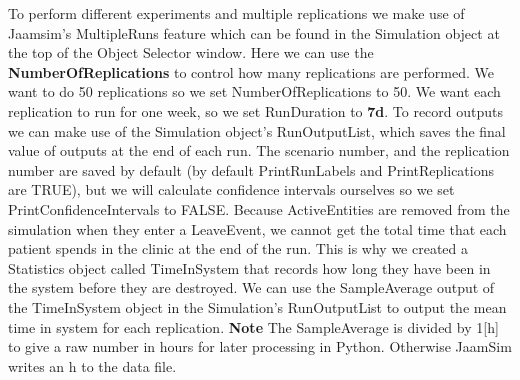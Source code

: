\documentclass[
  10pt,
  a4paperpaper,
  DIV=11,
  numbers=noendperiod,
  oneside]{scrreprt}
\begin{document}
To perform different experiments and multiple replications we make use
of Jaamsim's MultipleRuns feature which can be found in the Simulation
object at the top of the Object Selector window. Here we can use the
\textbf{NumberOfReplications} to control how many replications are
performed. We want to do 50 replications so we set NumberOfReplications
to 50. We want each replication to run for one week, so we set
RunDuration to \textbf{7d}. To record outputs we can make use of the
Simulation object's RunOutputList, which saves the final value of
outputs at the end of each run. The scenario number, and the replication
number are saved by default (by default PrintRunLabels and
PrintReplications are TRUE), but we will calculate confidence intervals
ourselves so we set PrintConfidenceIntervals to FALSE. Because
ActiveEntities are removed from the simulation when they enter a
LeaveEvent, we cannot get the total time that each patient spends in the
clinic at the end of the run. This is why we created a Statistics object
called TimeInSystem that records how long they have been in the system
before they are destroyed. We can use the SampleAverage output of the
TimeInSystem object in the Simulation's RunOutputList to output the mean
time in system for each replication. \textbf{Note} The SampleAverage is
divided by 1{[}h{]} to give a raw number in hours for later processing
in Python. Otherwise JaamSim writes an h to the data file.

\begin{table}

\caption{\label{tbl-sim_params}Simulation Parameters}


\end{table}%
\end{document}
